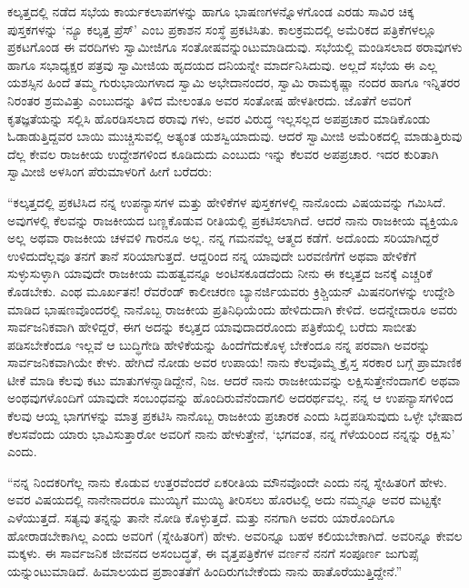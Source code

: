 ಕಲ್ಕತ್ತದಲ್ಲಿ ನಡೆದ ಸಭೆಯ ಕಾರ್ಯಕಲಾಪಗಳನ್ನು ಹಾಗೂ ಭಾಷಣಗಳನ್ನೊಳಗೊಂಡ ಎರಡು ಸಾವಿರ ಚಿಕ್ಕ ಪುಸ್ತಕಗಳನ್ನು ‘ನ್ಯೂ ಕಲ್ಕತ್ತ ಪ್ರೆಸ್​’ ಎಂಬ ಪ್ರಕಾಶನ ಸಂಸ್ಥೆ ಪ್ರಕಟಿಸಿತು. ಕಾಲಕ್ರಮದಲ್ಲಿ ಅಮೆರಿಕದ ಪತ್ರಿಕೆಗಳಲ್ಲೂ ಪ್ರಕಟಗೊಂಡ ಈ ವರದಿಗಳು ಸ್ವಾಮೀಜಿಗೂ ಸಂತೋಷವನ್ನುಂಟುಮಾಡಿದುವು. ಸಭೆಯಲ್ಲಿ ಮಂಡಿಸಲಾದ ಠರಾವುಗಳು ಹಾಗೂ ಸಭಾಧ್ಯಕ್ಷರ ಪತ್ರವು ಸ್ವಾಮೀಜಿಯ ಹೃದಯದ ದನಿಯನ್ನೇ ಮಾರ್ದನಿಸಿದುವು. ಅಲ್ಲದೆ ಸಭೆಯ ಈ ಎಲ್ಲ ಯಶಸ್ಸಿನ ಹಿಂದೆ ತಮ್ಮ ಗುರುಭಾಯಿಗಳಾದ ಸ್ವಾಮಿ ಅಭೇದಾನಂದರ, ಸ್ವಾಮಿ ರಾಮಕೃಷ್ಣಾ ನಂದರ ಹಾಗೂ ಇನ್ನಿತರರ ನಿರಂತರ ಶ್ರಮವಿತ್ತು ಎಂಬುದನ್ನು ತಿಳಿದ ಮೇಲಂತೂ ಅವರ ಸಂತೋಷ ಹೇಳತೀರದು. ಜೊತೆಗೆ ಅವರಿಗೆ ಕೃತಜ್ಞತೆಯನ್ನು ಸಲ್ಲಿಸಿ ಹೊರಡಿಸಲಾದ ಠರಾವು ಗಳು, ಅವರ ವಿರುದ್ಧ ಇಲ್ಲಸಲ್ಲದ ಅಪಪ್ರಚಾರ ಮಾಡಿಕೊಂಡು ಓಡಾಡುತ್ತಿದ್ದವರ ಬಾಯಿ ಮುಚ್ಚಿಸುವಲ್ಲಿ ಅತ್ಯಂತ ಯಶಸ್ವಿಯಾದುವು. ಆದರೆ ಸ್ವಾಮೀಜಿ ಅಮೆರಿಕದಲ್ಲಿ ಮಾಡುತ್ತಿರುವು ದೆಲ್ಲ ಕೇವಲ ರಾಜಕೀಯ ಉದ್ದೇಶಗಳಿಂದ ಕೂಡಿದುದು ಎಂಬುದು ಇನ್ನು ಕೆಲವರ ಅಪಪ್ರಚಾರ. ಇದರ ಕುರಿತಾಗಿ ಸ್ವಾಮೀಜಿ ಅಳಸಿಂಗ ಪೆರುಮಾಳರಿಗೆ ಹೀಗೆ ಬರೆದರು:

“ಕಲ್ಕತ್ತದಲ್ಲಿ ಪ್ರಕಟಿಸಿದ ನನ್ನ ಉಪನ್ಯಾಸಗಳ ಮತ್ತು ಹೇಳಿಕೆಗಳ ಪುಸ್ತಕಗಳಲ್ಲಿ ನಾನೊಂದು ವಿಷಯವನ್ನು ಗಮಿಸಿದೆ. ಅವುಗಳಲ್ಲಿ ಕೆಲವನ್ನು ರಾಜಕೀಯದ ಬಣ್ಣಕೊಡುವ ರೀತಿಯಲ್ಲಿ ಪ್ರಕಟಿಸಲಾಗಿದೆ. ಆದರೆ ನಾನು ರಾಜಕೀಯ ವ್ಯಕ್ತಿಯೂ ಅಲ್ಲ ಅಥವಾ ರಾಜಕೀಯ ಚಳವಳಿ ಗಾರನೂ ಅಲ್ಲ. ನನ್ನ ಗಮನವೆಲ್ಲ ಆತ್ಮದ ಕಡೆಗೆ. ಅದೊಂದು ಸರಿಯಾಗಿದ್ದರೆ ಉಳಿದುದೆಲ್ಲವೂ ತನಗೆ ತಾನೆ ಸರಿಯಾಗುತ್ತದೆ. ಆದ್ದರಿಂದ ನನ್ನ ಯಾವುದೇ ಬರವಣಿಗೆಗೆ ಅಥವಾ ಹೇಳಿಕೆಗೆ ಸುಳ್ಳುಸುಳ್ಳಾಗಿ ಯಾವುದೇ ರಾಜಕೀಯ ಮಹತ್ವವನ್ನೂ ಅಂಟಿಸಕೂಡದೆಂದು ನೀನು ಈ ಕಲ್ಕತ್ತದ ಜನಕ್ಕೆ ಎಚ್ಚರಿಕೆ ಕೊಡಬೇಕು. ಎಂಥ ಮೂರ್ಖತನ! ರೆವರೆಂಡ್ ಕಾಲೀಚರಣ ಬ್ಯಾನರ್ಜಿಯವರು ಕ್ರಿಶ್ಚಿಯನ್ ಮಿಷನರಿಗಳನ್ನು ಉದ್ದೇಶಿ ಮಾಡಿದ ಭಾಷಣವೊಂದರಲ್ಲಿ ನಾನೊಬ್ಬ ರಾಜಕೀಯ ಪ್ರತಿನಿಧಿಯೆಂದು ಹೇಳಿದುದಾಗಿ ಕೇಳಿದೆ. ಅದನ್ನೇದಾರೂ ಅವರು ಸಾರ್ವಜನಿಕವಾಗಿ ಹೇಳಿದ್ದರೆ, ಈಗ ಅದನ್ನು ಕಲ್ಕತ್ತದ ಯಾವುದಾದರೊಂದು ಪತ್ರಿಕೆಯಲ್ಲಿ ಬರೆದು ಸಾಬೀತು ಪಡಿಸಬೇಕೆಂದೂ ಇಲ್ಲವೆ ಆ ಬುದ್ಧಿಗೇಡಿ ಹೇಳಿಕೆಯನ್ನು ಹಿಂದೆಗೆದುಕೊಳ್ಳ ಬೇಕೆಂದೂ ನನ್ನ ಪರವಾಗಿ ಅವರನ್ನು ಸಾರ್ವಜನಿಕವಾಗಿಯೇ ಕೇಳು. ಹೇಗಿದೆ ನೋಡು ಅವರ ಉಪಾಯ! ನಾನು ಕೆಲವೊಮ್ಮೆ ಕ್ರೈಸ್ತ ಸರಕಾರ ಬಗ್ಗೆ ಪ್ರಾಮಾಣಿಕ ಟೀಕೆ ಮಾಡಿ ಕೆಲವು ಕಟು ಮಾತುಗಳನ್ನಾಡಿದ್ದೇನೆ, ನಿಜ. ಆದರೆ ನಾನು ರಾಜಕೀಯವನ್ನು ಲಕ್ಷಿಸುತ್ತೇನೆಂದಾಗಲಿ ಅಥವಾ ಅಂಥವುಗಳೊಂದಿಗೆ ಯಾವುದೇ ಸಂಬಂಧವನ್ನು ಹೊಂದಿರುವೆನೆಂದಾಗಲಿ ಅದರರ್ಥವಲ್ಲ. ನನ್ನ ಆ ಉಪನ್ಯಾಸಗಳಿಂದ ಕೆಲವು ಆಯ್ದ ಭಾಗಗಳನ್ನು ಮಾತ್ರ ಪ್ರಕಟಿಸಿ ನಾನೊಬ್ಬ ರಾಜಕೀಯ ಪ್ರಚಾರಕ ಎಂದು ಸಿದ್ಧಪಡಿಸುವುದು ಒಳ್ಳೇ ಭೇಷಾದ ಕೆಲಸವೆಂದು ಯಾರು ಭಾವಿಸುತ್ತಾರೋ ಅವರಿಗೆ ನಾನು ಹೇಳುತ್ತೇನೆ, ‘ಭಗವಂತ, ನನ್ನ ಗೆಳೆಯರಿಂದ ನನ್ನನ್ನು ರಕ್ಷಿಸು’ ಎಂದು.

“ನನ್ನ ನಿಂದಕರಿಗೆಲ್ಲ ನಾನು ಕೊಡುವ ಉತ್ತರವೆಂದರೆ ಏಕರೀತಿಯ ಮೌನವೊಂದೇ ಎಂದು ನನ್ನ ಸ್ನೇಹಿತರಿಗೆ ಹೇಳು. ಅವರ ವಿಷಯದಲ್ಲಿ ನಾನೇನಾದರೂ ಮುಯ್ಯಿಗೆ ಮುಯ್ಯಿ ತೀರಿಸಲು ಹೊರಟಲ್ಲಿ ಅದು ನಮ್ಮನ್ನೂ ಅವರ ಮಟ್ಟಕ್ಕೇ ಎಳೆಯುತ್ತದೆ. ಸತ್ಯವು ತನ್ನನ್ನು ತಾನೇ ನೋಡಿ ಕೊಳ್ಳುತ್ತದೆ. ಮತ್ತು ನನಗಾಗಿ ಅವರು ಯಾರೊಂದಿಗೂ ಹೋರಾಡಬೇಕಾಗಿಲ್ಲ ಎಂದು ಅವರಿಗೆ (ಸ್ನೇಹಿತರಿಗೆ) ಹೇಳು. ಅವರಿನ್ನೂ ಬಹಳ ಕಲಿಯಬೇಕಾಗಿದೆ. ಅವರಿನ್ನೂ ಕೇವಲ ಮಕ್ಕಳು. ಈ ಸಾರ್ವಜನಿಕ ಜೀವನದ ಅಸಂಬದ್ಧತೆ, ಈ ವೃತ್ತಪತ್ರಿಕೆಗಳ ವರ್ಣನೆ ನನಗೆ ಸಂಪೂರ್ಣ ಜುಗುಪ್ಸೆ ಯನ್ನುಂಟುಮಾಡಿದೆ. ಹಿಮಾಲಯದ ಪ್ರಶಾಂತತೆಗೆ ಹಿಂದಿರುಗಬೇಕೆಂದು ನಾನು ಹಾತೊರೆಯುತ್ತಿದ್ದೇನೆ.”

